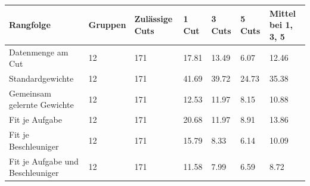 \begin{tabular}{@{}lllllll@{}}
\toprule
Rangfolge & Gruppen & Zulässige Cuts & 1 Cut & 3 Cuts & 5 Cuts & Mittel bei 1, 3, 5 \\
\midrule
Datenmenge am Cut & 12 & 171 & 17.81 & 13.49 & 6.07 & 12.46 \\
Standardgewichte & 12 & 171 & 41.69 & 39.72 & 24.73 & 35.38 \\
Gemeinsam gelernte Gewichte & 12 & 171 & 12.53 & 11.97 & 8.15 & 10.88 \\
Fit je Aufgabe & 12 & 171 & 20.68 & 11.97 & 8.91 & 13.86 \\
Fit je Beschleuniger & 12 & 171 & 15.79 & 8.33 & 6.14 & 10.09 \\
Fit je Aufgabe und Beschleuniger & 12 & 171 & 11.58 & 7.99 & 6.59 & 8.72 \\
\bottomrule
\end{tabular}
